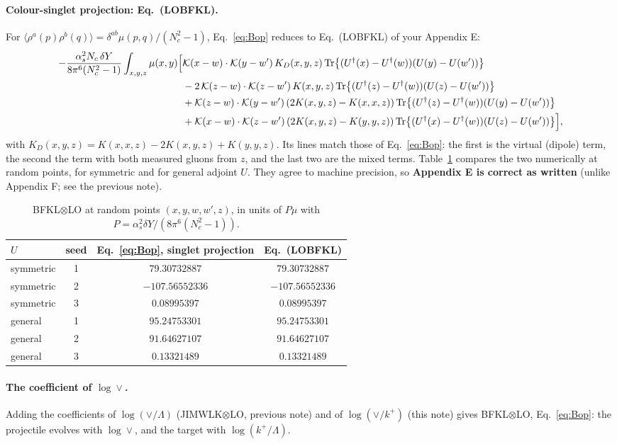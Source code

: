 \documentclass[10pt]{article}
\numberwithin{equation}{section}
\newcommand{\KK}{\mathcal K}
\newcommand{\Ud}{U^{\dagger}}
\newcommand{\Tr}{{\rm Tr}}
\begin{document}
\paragraph{Colour-singlet projection: Eq.~(LOBFKL).} For $\langle\rho^a(p)\rho^b(q)\rangle=\delta^{ab}\mu(p,q)/(N_c^2-1)$, Eq.~\eqref{eq:Bop} reduces to Eq.~(LOBFKL) of your Appendix E:
\begin{align}
-\frac{\alpha_s^2N_c\,\delta Y}{8\pi^6(N_c^2-1)}\int_{x,y,z}\mu(x,y)\Big[&\KK(x-w)\cdot\KK(y-w')\,K_D(x,y,z)\,\Tr\big\{(\Ud(x)-\Ud(w))(U(y)-U(w'))\big\}\notag\\
&-2\,\KK(z-w)\cdot\KK(z-w')\,K(x,y,z)\,\Tr\big\{(\Ud(z)-\Ud(w))(U(z)-U(w'))\big\}\notag\\
&+\KK(z-w)\cdot\KK(y-w')\,(2K(x,y,z)-K(x,x,z))\,\Tr\big\{(\Ud(z)-\Ud(w))(U(y)-U(w'))\big\}\notag\\
&+\KK(x-w)\cdot\KK(z-w')\,(2K(x,y,z)-K(y,y,z))\,\Tr\big\{(\Ud(x)-\Ud(w))(U(z)-U(w'))\big\}\Big],
\end{align}
with $K_D(x,y,z)=K(x,x,z)-2K(x,y,z)+K(y,y,z)$. Its lines match those of Eq.~\eqref{eq:Bop}: the first is the virtual (dipole) term, the second the term with both measured gluons from $z$, and the last two are the mixed terms. Table~\ref{tab:singlet} compares the two numerically at random points, for symmetric and for general adjoint $U$. They agree to machine precision, so \textbf{Appendix E is correct as written} (unlike Appendix F; see the previous note).

\begin{table}[H]
\centering\small
\begin{tabular}{@{}l c c c@{}}
$U$ & seed & Eq.~\eqref{eq:Bop}, singlet projection & Eq.~(LOBFKL) \\ \hline
symmetric & 1 & $79.30732887$ & $79.30732887$\\
symmetric & 2 & $-107.56552336$ & $-107.56552336$\\
symmetric & 3 & $0.08995397$ & $0.08995397$\\
general & 1 & $95.24753301$ & $95.24753301$\\
general & 2 & $91.64627107$ & $91.64627107$\\
general & 3 & $0.13321489$ & $0.13321489$\\
\end{tabular}
\caption{BFKL$\otimes$LO at random points $(x,y,w,w',z)$, in units of $P\mu$ with $P=\alpha_s^2\delta Y/(8\pi^6(N_c^2-1))$.}\label{tab:singlet}
\end{table}

\paragraph{The coefficient of $\log\vee$.} Adding the coefficients of $\log(\vee/\Lambda)$ (JIMWLK$\otimes$LO, previous note) and of $\log(\vee/k^+)$ (this note) gives BFKL$\otimes$LO, Eq.~\eqref{eq:Bop}: the projectile evolves with $\log\vee$, and the target with $\log(k^+/\Lambda)$.
\end{document}

